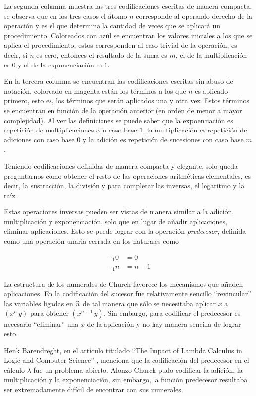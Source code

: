 La segunda columna muestra las tres codificaciones escritas de manera compacta, se observa que en los tres casos el átomo \( n \) corresponde al operando derecho de la operación y es el que determina la cantidad de veces que se aplicará un procedimiento. Coloreados con azúl se encuentran los valores iniciales a los que se aplica el procedimiento, estos corresponden al caso trivial de la operación, es decir, si \( n \) es cero, entonces el resultado de la suma es \( m \), el de la multiplicación es \( 0 \) y el de la exponenciación es \( 1 \).

En la tercera columna se encuentran las codificaciones escritas sin abuso de notación, coloreado en magenta están los términos a los que \( n \) es aplicado primero, esto es, los términos que serán aplicados una y otra vez. Estos términos se encuentran en función de la operación anterior (en orden de menor a mayor complejidad). Al ver las definiciones se puede saber que la expoenciación es repetición de multiplicaciones con caso base \( 1 \), la multiplicación es repetición de adiciones con caso base \( 0 \) y la adición es repetición de sucesiones con caso base \( m \).

Teniendo codificaciones definidas de manera compacta y elegante, solo queda preguntarnos cómo obtener el resto de las operaciones aritméticas elementales, es decir, la sustracción, la división y para completar las inversas, el logaritmo y la raíz.

Estas operaciones inversas pueden ser vistas de manera similar a la adición, multiplicación y exponenciación, solo que en lugar de añadir aplicaciones, eliminar aplicaciones. Esto se puede lograr con la operación \emph{predecesor}, definida como una operación unaria cerrada en los naturales como

\begin{align*}
  -_{1} 0 &= 0 \\
  -_{1} n &= n-1
\end{align*}

La estructura de los numerales de Church favorece los mecanismos que añaden aplicaciones. En la codificación del sucesor fue relativamente sencillo ``revincular'' las variables ligadas en \( \widehat{n} \) de tal manera que sólo se necesitaba aplicar \( x \) a \( (x^{n}\, y) \) para obtener \( (x^{n+1}\, y) \). Sin embargo, para codificar el predecesor es necesario ``eliminar'' una \( x \) de la aplicación y no hay manera sencilla de lograr esto.

Henk Barendreght, en el artículo titulado ``The Impact of Lambda Calculus in Logic and Computer Science'' \cite{Barendregt:Impact}, menciona que la codificación del predecesor en el cálculo \( λ \) fue un problema abierto. Alonzo Church pudo codificar la adición, la multiplicación y la exponenciación, sin embargo, la función predecesor resultaba ser extremadamente difícil de encontrar con sus numerales.

